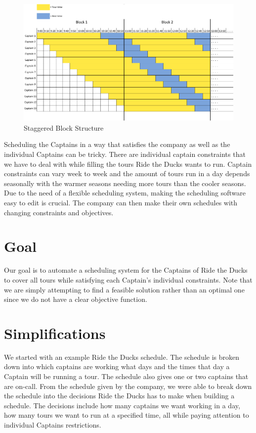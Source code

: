 \documentclass[12pt]{article}
\begin{document}
\begin{figure}[h!]
\centering
\includegraphics[scale=0.7]{block_figure2.png}
\caption{Staggered Block Structure}

\end{figure}

Scheduling the Captains in a way that satisfies the company as well as the 
individual Captains can be tricky. There are individual captain constraints that we have to deal with while filling the tours Ride the Ducks wants to run. Captain constraints can vary week to week and the amount of tours run in a day depends seasonally with the warmer seasons needing more tours than the cooler seasons. Due to the need of a flexible scheduling system, making the scheduling software easy to edit is crucial. The company can then 
make their own schedules with changing constraints and objectives.

\section*{Goal}
Our goal is to automate a scheduling system for the Captains of Ride the Ducks to cover all tours while satisfying each Captain's individual constraints. Note that we are simply attempting to find a feasible solution rather than an optimal one since we do not have a clear objective function. %

\section*{Simplifications}
We started with an example Ride the Ducks schedule. The schedule is broken down into which captains are working what days and the times that day a Captain will be running a tour. The schedule also gives one or two captains that are on-call. From the schedule given by the company, we were able to break down the schedule into the decisions Ride the Ducks has to make when building a schedule. The decisions include how many captains we want working in a day, how many tours we want to run at a specified time, all while paying attention to individual Captains restrictions. 
\end{document}
